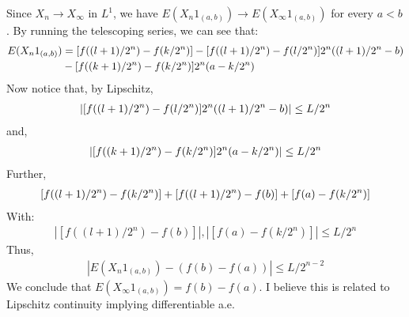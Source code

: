 \documentclass[12pt]{article}
\theoremstyle{definitionstyle}
\newcommand{\1}{\mathds 1}
\begin{document}
    \begin{center}
    \end{center}
    Since $X_n \to X_\infty$ in $L^1$, we have $E(X_n 1_{(a,b)}) \to E(X_\infty 1_{(a,b)})$ for every $a < b$. By running the telescoping series, we can see that:
    \begin{align*}
        E(X_n 1_{(a,b)}) &= \qty[f((l+1)/2^n) - f(k/2^n)] - \qty[f((l+1)/2^n) - f(l/2^n)]2^n ((l+1)/2^n - b) \\
        & - \qty[f((k+1)/2^n) - f(k/2^n)] 2^n (a - k/2^n)
    \end{align*}
    Now notice that, by Lipschitz,
    \begin{align*}
        |\qty[f((l+1)/2^n) - f(l/2^n)]2^n ((l+1)/2^n - b)| \leq L/2^n
    \end{align*}
    and,
    \begin{align*}
        |\qty[f((k+1)/2^n) - f(k/2^n)] 2^n (a - k/2^n)| \leq L/2^n
    \end{align*}
    Further,
    \begin{align*}
        \qty[f((l+1)/2^n) - f(k/2^n)] + \qty[f((l+1)/2^n) - f(b)] + [f(a) - f(k/2^n)]
    \end{align*}
    With:
    \begin{align*}
        |[f((l+1)/2^n) - f(b)]| , |[f(a) - f(k/2^n)]| \leq L/2^n
    \end{align*}
    Thus,
    \begin{align*}
        |E(X_n 1_{(a,b)}) - (f(b)-f(a))| \leq L/2^{n-2}
    \end{align*}
    We conclude that $E(X_\infty 1_{(a,b)}) = f(b) - f(a)$. I believe this is related to Lipschitz continuity implying differentiable a.e.
\end{document}
